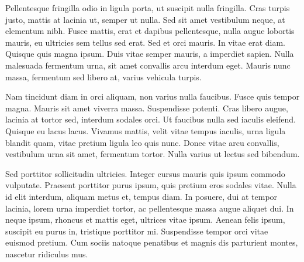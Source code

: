 \documentclass[12pt]{article}
\begin{document}
\begin{mla}
Pellentesque fringilla odio in ligula porta, ut suscipit nulla fringilla. Cras turpis justo, mattis at lacinia ut, semper ut nulla. Sed sit amet vestibulum neque, at elementum nibh. Fusce mattis, erat et dapibus pellentesque, nulla augue lobortis mauris, eu ultricies sem tellus sed erat. Sed et orci mauris. In vitae erat diam. Quisque quis magna ipsum. Duis vitae semper mauris, a imperdiet sapien. Nulla malesuada fermentum urna, sit amet convallis arcu interdum eget. Mauris nunc massa, fermentum sed libero at, varius vehicula turpis.

Nam tincidunt diam in orci aliquam, non varius nulla faucibus. Fusce quis tempor magna. Mauris sit amet viverra massa. Suspendisse potenti. Cras libero augue, lacinia at tortor sed, interdum sodales orci. Ut faucibus nulla sed iaculis eleifend. Quisque eu lacus lacus. Vivamus mattis, velit vitae tempus iaculis, urna ligula blandit quam, vitae pretium ligula leo quis nunc. Donec vitae arcu convallis, vestibulum urna sit amet, fermentum tortor. Nulla varius ut lectus sed bibendum.

Sed porttitor sollicitudin ultricies. Integer cursus mauris quis ipsum commodo vulputate. Praesent porttitor purus ipsum, quis pretium eros sodales vitae. Nulla id elit interdum, aliquam metus et, tempus diam. In posuere, dui at tempor lacinia, lorem urna imperdiet tortor, ac pellentesque massa augue aliquet dui. In neque ipsum, rhoncus et mattis eget, ultrices vitae ipsum. Aenean felis ipsum, suscipit eu purus in, tristique porttitor mi. Suspendisse tempor orci vitae euismod pretium. Cum sociis natoque penatibus et magnis dis parturient montes, nascetur ridiculus mus. 


\newpage
\printbibliography[heading=bibmla]

\end{mla}
\end{document}
